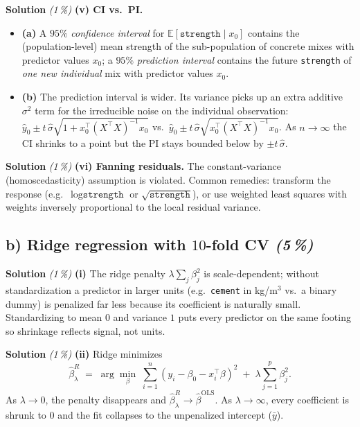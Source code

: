 \documentclass[11pt,a4paper]{article}
\newcommand{\subpoints}[1]{\textit{(#1\,\%)}}
\newcommand{\sol}{\noindent\textbf{Solution}}
\begin{document}
\medskip
\sol{} \subpoints{1} \textbf{(v) CI vs.\ PI.}
\begin{itemize}
  \item \textbf{(a)} A $95\%$ \emph{confidence interval} for $\mathbb{E}[\texttt{strength}\mid x_0]$
        contains the (population-level) mean strength of the sub-population of concrete mixes with
        predictor values $x_0$; a $95\%$ \emph{prediction interval} contains the future
        \texttt{strength} of \emph{one new individual} mix with predictor values $x_0$.
  \item \textbf{(b)} The prediction interval is wider. Its variance picks up an extra additive
        $\sigma^2$ term for the irreducible noise on the individual observation: ${\hat y}_0\pm t\,
        \hat\sigma\sqrt{1 + x_0^\top(X^\top X)^{-1}x_0}$ vs.\ ${\hat y}_0\pm t\,
        \hat\sigma\sqrt{x_0^\top(X^\top X)^{-1}x_0}$. As $n\to\infty$ the CI shrinks to a point but
        the PI stays bounded below by $\pm t\,\hat\sigma$.
\end{itemize}

\medskip
\sol{} \subpoints{1} \textbf{(vi) Fanning residuals.} The constant-variance (homoscedasticity)
assumption is violated. Common remedies: transform the response (e.g.\ $\log\texttt{strength}$ or
$\sqrt{\texttt{strength}}$), or use weighted least squares with weights inversely proportional to
the local residual variance.

\subsection*{b) Ridge regression with $10$-fold CV \subpoints{5}}

\sol{} \subpoints{1} \textbf{(i)} The ridge penalty $\lambda\sum_j\beta_j^2$ is scale-dependent;
without standardization a predictor in larger units (e.g.\ \texttt{cement} in kg/m$^3$ vs.\ a
binary dummy) is penalized far less because its coefficient is naturally small. Standardizing to
mean $0$ and variance $1$ puts every predictor on the same footing so shrinkage reflects signal,
not units.

\medskip
\sol{} \subpoints{1} \textbf{(ii)} Ridge minimizes
$$\hat\beta^R_\lambda \;=\; \arg\min_{\beta}\; \sum_{i=1}^n (y_i - \beta_0 - x_i^\top\beta)^2
   \;+\; \lambda\sum_{j=1}^p \beta_j^2.$$
As $\lambda\to 0$, the penalty disappears and $\hat\beta^R_\lambda\to\hat\beta^{\mathrm{OLS}}$.
As $\lambda\to\infty$, every coefficient is shrunk to $0$ and the fit collapses to the
unpenalized intercept ($\bar y$).
\end{document}
